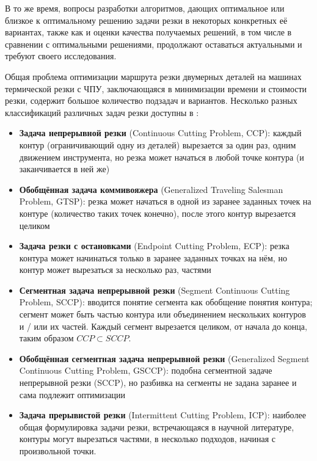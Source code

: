 \documentclass[14pt]{extarticle}
\theoremstyle{plain}%
\theoremstyle{remark}
\begin{document}
В то же время,
вопросы разработки алгоритмов,
дающих оптимальное или близкое к оптимальному
решению задачи резки
в некоторых конкретных её вариантах,
также как и оценки качества получаемых решений,
в том числе в сравнении с оптимальными решениями,
продолжают оставаться актуальными и
требуют своего исследования.

Общая проблема оптимизации маршрута резки
двумерных деталей на машинах термической резки с ЧПУ,
заключающаяся в минимизации времени и стоимости резки,
содержит большое количество подзадач и вариантов.
Несколько разных классификаций различных задач резки
доступны в
\cite{bi01,bi02,bi03}:

\begin{itemize}
  \item
  \textbf{Задача непрерывной резки}
  (Continuous Cutting Problem, CCP):
  каждый контур
  (ограничивающий одну из деталей)
  вырезается за один раз,
  одним движением инструмента,
  но резка может начаться в любой точке контура
  (и заканчивается в ней же)

  \item
  \textbf{Обобщённая задача коммивояжера}
  (Generalized Traveling Salesman Problem, GTSP):
  резка может начаться в одной из заранее
  заданных точек на контуре
  (количество таких точек конечно),
  после этого контур вырезается целиком

  \item
  \textbf{Задача резки с остановками}
  (Endpoint Cutting Problem, ECP):
  резка контура может начинаться только в
  заранее заданных точках на нём,
  но контур может вырезаться за несколько раз,
  частями

  \item
  \textbf{Сегментная задача непрерывной резки}
  (Segment Continuous Cutting Problem, SCCP):
  вводится понятие сегмента
  как обобщение понятия контура;
  сегмент может быть частью контура
  или объединением нескольких контуров
  и / или их частей.
  Каждый сегмент вырезается целиком,
  от начала до конца,
  таким образом
  $ CCP \subset SCCP$.

  \item
  \textbf{Обобщённая сегментная задача непрерывной резки}
  (Generalized Segment Continuous Cutting Problem, GSCCP):
  подобна сегментной задаче непрерывной резки
  (SCCP),
  но разбивка на сегменты не задана заранее
  и сама подлежит оптимизации

  \item
  \textbf{Задача прерывистой резки}
  (Intermittent Cutting Problem, ICP):
  наиболее общая формулировка задачи резки,
  встречающаяся в научной литературе,
  контуры могут вырезаться частями,
  в несколько подходов,
  начиная с произвольной точки.
\end{itemize}
\end{document}
